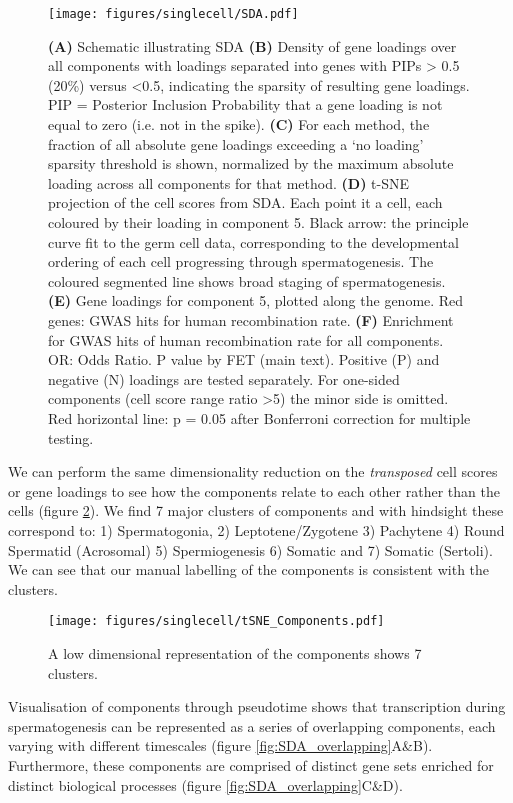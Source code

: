 \begin{figure}[H]
	\centering
	\texttt{[image: figures/singlecell/SDA.pdf]}
	\caption[SDA]{
		\textbf{(A)} Schematic illustrating SDA
		\textbf{(B)} Density of gene loadings over all components with loadings separated into genes with PIPs > 0.5 (20\%) versus <0.5, indicating the sparsity of resulting gene loadings. PIP = Posterior Inclusion Probability that a gene loading is not equal to zero (i.e. not in the spike).
		\textbf{(C)} For each method, the fraction of all absolute gene loadings exceeding a ‘no loading’ sparsity threshold is shown, normalized by the maximum absolute loading across all components for that method. 
		\textbf{(D)} t-SNE projection of the cell scores from SDA. Each point it a cell, each coloured by their loading in component 5. Black arrow: the principle curve fit to the germ cell data, corresponding to the developmental ordering of each cell progressing through spermatogenesis. The coloured segmented line shows broad staging of spermatogenesis.
		\textbf{(E)} Gene loadings for component 5, plotted along the genome. Red genes: GWAS hits for human recombination rate.
		\textbf{(F)} Enrichment for GWAS hits of human recombination rate for all components. OR: Odds Ratio. P value by FET (main text). Positive (P) and negative (N) loadings are tested separately. For one-sided components (cell score range ratio >5) the minor side is omitted. Red horizontal line: p = 0.05 after Bonferroni correction for multiple testing.
	}
	\label{fig:SDA}
\end{figure}

We can perform the same dimensionality reduction on the \emph{transposed} cell scores or gene loadings to see how the components relate to each other rather than the cells (figure \ref{fig:tSNE_Components}). We find 7 major clusters of components and with hindsight these correspond to: 1) Spermatogonia, 2) Leptotene/Zygotene 3) Pachytene 4) Round Spermatid (Acrosomal) 5) Spermiogenesis 6) Somatic and 7) Somatic (Sertoli). We can see that our manual labelling of the components is consistent with the clusters.

\begin{figure}[H]
	\centering
	\texttt{[image: figures/singlecell/tSNE\_Components.pdf]}
	\caption[tSNE of Components]{A low dimensional representation of the components shows 7 clusters.}
	\label{fig:tSNE_Components}
\end{figure}

Visualisation of components through pseudotime shows that transcription during spermatogenesis can be represented as a series of overlapping components, each varying with different timescales (figure \ref{fig:SDA_overlapping}A\&B). Furthermore, these components are comprised of distinct gene sets enriched for distinct biological processes (figure \ref{fig:SDA_overlapping}C\&D).

